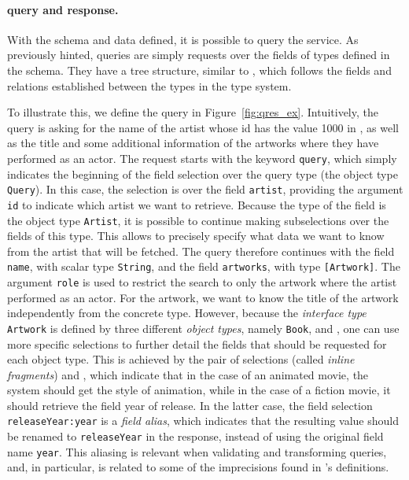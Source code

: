 

\paragraph{\gql query and response.}

With the schema and data defined, it is possible to query the service. 
As previously hinted, \gql queries are simply requests over the fields of types defined in the schema.
They have a tree structure, similar to \json, which follows the fields and relations established between the types
in the type system.

To illustrate this, we define the query in
Figure~\ref{fig:qres_ex}. Intuitively, the query is asking for the name of the artist
whose id has the value 1000 in \goodbois, as well as the title and some additional
information of the artworks where they have performed as an actor.
The request starts with the keyword \texttt{query}, which simply indicates the beginning
 of the field selection over the query type (the object type \texttt{Query}).
In this case, the selection is over the field
\texttt{artist}, providing the argument
\texttt{id} to indicate which artist we want to retrieve.
Because the type of the field is the object type \texttt{Artist}, 
it is possible to continue making subselections over the fields of this type.
This allows to precisely specify what data we want to know from the artist that will be fetched. 
The query therefore continues with the field \texttt{name}, with scalar type \texttt{String}, and the field
\texttt{artworks}, with type \texttt{[Artwork]}. The argument \texttt{role} is
used to restrict the search to only the artwork where the artist performed as an actor.
For the artwork, we want to know the title of the artwork independently from 
the concrete type. However, because the {\em interface
type} \texttt{Artwork} is defined by three different {\em object types},
namely \texttt{Book}, \fiction and \animation, one can use more specific
selections to further detail the fields that should be requested for
each object type. 
This is achieved by the pair of selections (called {\em inline fragments})
 and , which indicate that in the case of an 
  animated movie, the system should get the style of animation,
   while in the case of a fiction movie, it should
retrieve the field year of release. In the latter case, the field selection
\texttt{releaseYear:year} is a {\em field alias}, which indicates that
the resulting value should be renamed to \texttt{releaseYear} in the response, instead of using the original field name \texttt{year}.
This aliasing is relevant when validating and transforming queries, and, in particular, 
is related to some of the imprecisions found in \HP's definitions.


